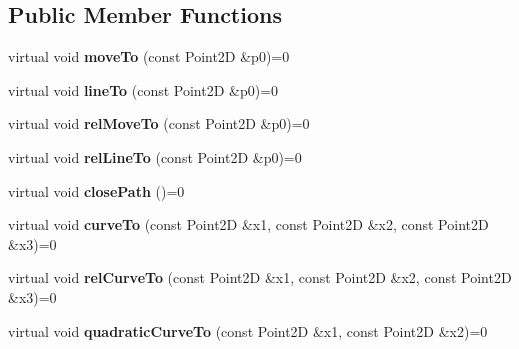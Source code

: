 \subsection*{Public Member Functions}
\begin{DoxyCompactItemize}
\item 
\hypertarget{classsambag_1_1disco_1_1_i_draw_context_a5087b239c24adb7fde90bc3a7b232715}{
virtual void {\bfseries moveTo} (const Point2D \&p0)=0}
\label{classsambag_1_1disco_1_1_i_draw_context_a5087b239c24adb7fde90bc3a7b232715}

\item 
\hypertarget{classsambag_1_1disco_1_1_i_draw_context_a6e56ef732ee024052f6461dc7ca9cd81}{
virtual void {\bfseries lineTo} (const Point2D \&p0)=0}
\label{classsambag_1_1disco_1_1_i_draw_context_a6e56ef732ee024052f6461dc7ca9cd81}

\item 
\hypertarget{classsambag_1_1disco_1_1_i_draw_context_a0af80829bd9fd7b959fb894df0da49ca}{
virtual void {\bfseries relMoveTo} (const Point2D \&p0)=0}
\label{classsambag_1_1disco_1_1_i_draw_context_a0af80829bd9fd7b959fb894df0da49ca}

\item 
\hypertarget{classsambag_1_1disco_1_1_i_draw_context_ab1d4ba04913116138a937f308f2cfdba}{
virtual void {\bfseries relLineTo} (const Point2D \&p0)=0}
\label{classsambag_1_1disco_1_1_i_draw_context_ab1d4ba04913116138a937f308f2cfdba}

\item 
\hypertarget{classsambag_1_1disco_1_1_i_draw_context_ab6c55a8cce7276da30d42edc0b59895a}{
virtual void {\bfseries closePath} ()=0}
\label{classsambag_1_1disco_1_1_i_draw_context_ab6c55a8cce7276da30d42edc0b59895a}

\item 
\hypertarget{classsambag_1_1disco_1_1_i_draw_context_a665245a8a3f17f4d0ecc3d64e32c69c1}{
virtual void {\bfseries curveTo} (const Point2D \&x1, const Point2D \&x2, const Point2D \&x3)=0}
\label{classsambag_1_1disco_1_1_i_draw_context_a665245a8a3f17f4d0ecc3d64e32c69c1}

\item 
\hypertarget{classsambag_1_1disco_1_1_i_draw_context_a405229704974f66abf5c8fa443acdcdc}{
virtual void {\bfseries relCurveTo} (const Point2D \&x1, const Point2D \&x2, const Point2D \&x3)=0}
\label{classsambag_1_1disco_1_1_i_draw_context_a405229704974f66abf5c8fa443acdcdc}

\item 
\hypertarget{classsambag_1_1disco_1_1_i_draw_context_af6c1598386646cd0bec7e8c1186af037}{
virtual void {\bfseries quadraticCurveTo} (const Point2D \&x1, const Point2D \&x2)=0}
\label{classsambag_1_1disco_1_1_i_draw_context_af6c1598386646cd0bec7e8c1186af037}


\end{DoxyCompactItemize}
